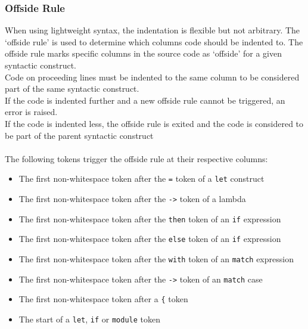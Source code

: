 \documentclass{report}
\begin{document}
\subsubsection{Offside Rule}
When using lightweight syntax, the indentation is flexible but not arbitrary. The `offside rule' is used to determine which columns code should be indented to. The offside rule marks specific columns in the source code as `offside' for a given syntactic construct.\\
Code on proceeding lines must be indented to the same column to be considered part of the same syntactic construct.\\
If the code is indented further and a new offside rule cannot be triggered, an error is raised.\\
If the code is indented less, the offside rule is exited and the code is considered to be part of the parent syntactic construct\\
\\
The following tokens trigger the offside rule at their respective columns:\\
\begin{itemize}
    \item{The first non-whitespace token after the \verb|=| token of a \verb|let| construct}
    \item{The first non-whitespace token after the \verb|->| token of a lambda}
    \item{The first non-whitespace token after the \verb|then| token of an \verb|if| expression}
    \item{The first non-whitespace token after the \verb|else| token of an \verb|if| expression}
    \item{The first non-whitespace token after the \verb|with| token of an \verb|match| expression}
    \item{The first non-whitespace token after the \verb|->| token of an \verb|match| case}
    \item{The first non-whitespace token after a \verb|{| token}
    \item{The start of a \verb|let|, \verb|if| or \verb|module| token}
\end{itemize}
\end{document}
